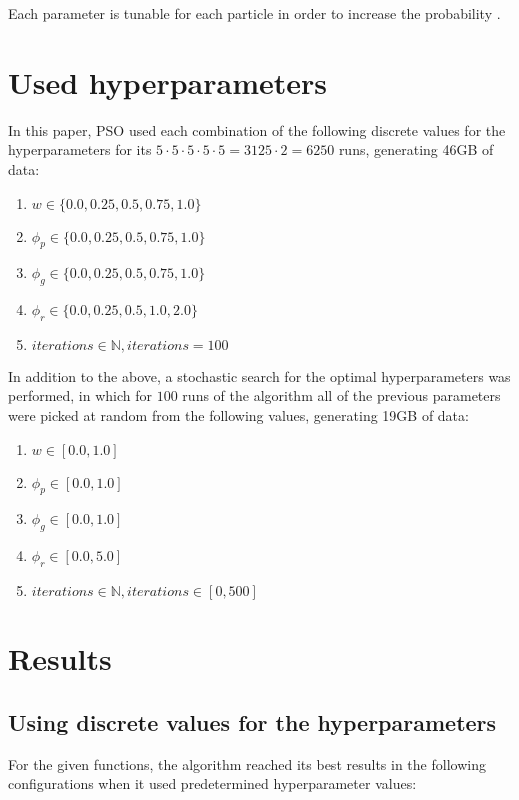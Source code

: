 \documentclass[conference]{IEEEtran}
\begin{document}
Each parameter is tunable for each particle in order to increase the probability .

\section{Used hyperparameters}
In this paper, PSO used each combination of the following discrete values for the hyperparameters for its $5 \cdot 5 \cdot 5 \cdot 5 \cdot 5 = 3125 \cdot 2 = 6250$
runs, generating 46GB of data:

\begin{enumerate}
    \item $w \in \{0.0, 0.25, 0.5, 0.75, 1.0\}$
    \item $\phi_p \in \{0.0, 0.25, 0.5, 0.75, 1.0\}$
    \item $\phi_g \in \{0.0, 0.25, 0.5, 0.75, 1.0\}$
    \item $\phi_r \in \{0.0, 0.25, 0.5, 1.0, 2.0\}$
    \item $iterations \in \mathbb{N}, iterations = 100$
\end{enumerate}

In addition to the above, a stochastic search for the optimal hyperparameters was performed, in which for $100$ runs of the algorithm
all of the previous parameters were picked at random from the following values, generating 19GB of data:

\begin{enumerate}
    \item $w \in [0.0, 1.0]$
    \item $\phi_p \in [0.0, 1.0]$
    \item $\phi_g \in [0.0, 1.0]$
    \item $\phi_r \in [0.0, 5.0]$
    \item $iterations \in \mathbb{N}, iterations \in [0, 500]$
\end{enumerate}

\section{Results}

\subsection{Using discrete values for the hyperparameters}
For the given functions, the algorithm reached its best results in the following configurations when it used predetermined
hyperparameter values:
\end{document}
